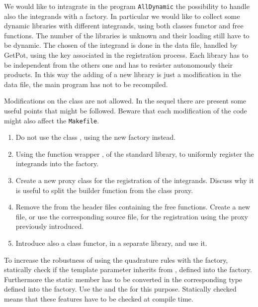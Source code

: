 
We would like to intragrate in the program \texttt{AllDynamic} the possibility
to handle also the integrands with a factory. In particular we would like to
collect some dynamic libraries with different integrands, using both classes
functor and free functions. The number of the libraries is unknown and their
loading still have to be dynamic. The chosen of the integrand is done in the
data file, handled by GetPot, using the key associated in the registration
process.  Each library has to be independent from the others one and has to
resister autonomously their products. In this way the adding of a new library is
just a modification in the data file, the main program has not to be recompiled.

Modifications on the class  are not allowed.
In the sequel there are present some useful points that might be followed.
Beware that each modification of the code might also affect the \texttt{Makefile}.

\begin{enumerate}

    \item Do not use the class , using the new factory
    instead.

    \item Using the function wrapper , of the standard
    library, to uniformly register the integrands into the factory.

    \item Create a new proxy class for the registration of the integrands.
    Discuss why it is useful to split the builder function from the class proxy.

    \item Remove the  from the header files containing the free
    functions. Create a new file, or use the corresponding source file,
    for the registration using the proxy previously introduced.

    \item Introduce also a class functor, in a separate library, and use it.

\end{enumerate}

To increase the robustness of using the quadrature rules with the factory,
statically check if the template parameter  inherits
from , defined into the factory. Furthermore the
static member  has to be converted in the corresponding type defined
into the factory. Use the  and the  for this
purpose. Statically checked means that these features have to be checked at
compile time.

